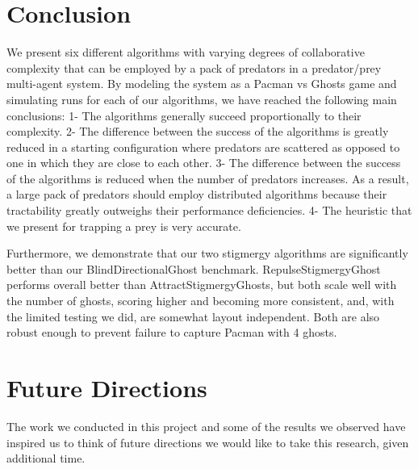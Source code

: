 \documentclass[11pt]{article}
\begin{document}
\begin{multicols}{2}

\section{Conclusion}
We present six different algorithms with varying degrees of collaborative complexity that can be employed by a pack of predators in a predator/prey multi-agent system. By modeling the system as a Pacman vs Ghosts game and simulating runs for each of our algorithms, we have reached the following main conclusions: 1- The algorithms generally succeed proportionally to their complexity. 2- The difference between the success of the algorithms is greatly reduced in a starting configuration where predators are scattered as opposed to one in which they are close to each other. 3- The difference between the success of the algorithms is reduced when the number of predators increases. As a result, a large pack of predators should employ distributed algorithms because their tractability greatly outweighs their performance deficiencies. 4- The heuristic that we present for trapping a prey is very accurate.

Furthermore, we demonstrate that our two stigmergy algorithms are significantly better than our BlindDirectionalGhost benchmark.  RepulseStigmergyGhost performs overall better than AttractStigmergyGhosts, but both scale well with the number of ghosts, scoring higher and becoming more consistent, and, with the limited testing we did, are somewhat layout independent.  Both are also robust enough to prevent failure to capture Pacman with 4 ghosts.

\section{Future Directions}
The work we conducted in this project and some of the results we observed have inspired us to think of future directions we would like to take this research, given additional time.


\end{multicols}
\end{document}
